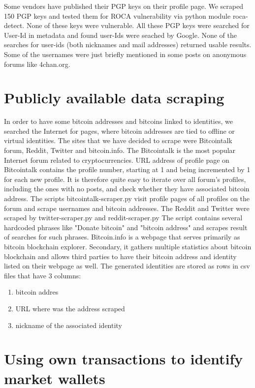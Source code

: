 \documentclass[
  digital, %
  table,   %
  lof,     %
  lot,     %
  oneside
]{fithesis3}
\begin{document}
Some vendors have published their PGP keys on their profile page.
We scraped 150 PGP keys and tested them for ROCA vulnerability via python module roca-detect. None of these keys were vulnerable.
All these PGP keys were searched for User-Id in metadata and found user-Ids were seached by Google.
None of the searches for user-ids (both nicknames and mail addresses) returned usable results.
Some of the usernames were just briefly mentioned in some posts on anonymous forums like 4chan.org.

\section{Publicly available data scraping}
\label{Publicly available data scraping}

In order to have some bitcoin addresses and bitcoins linked to identities,
we searched the Internet for pages, where bitcoin addresses are tied to offline or virtual identities.
The sites that we have decided to scrape were Bitcointalk forum, Reddit, Twitter and bitcoin.info.
The Bitcointalk is the most popular Internet forum
related to cryptocurrencies. URL address of profile page on Bitcointalk
contains the profile number, starting at 1 and being incremented by 1
for each new profile. It is therefore quite easy to iterate over all forum's profiles,
including the ones with no posts, and check whether they have associated bitcoin address.
The scripts bitcointalk-scraper.py visit profile pages of all profiles on the forum and scrape usernames and bitcoin addresses. 
The Reddit and Twitter were scraped by twitter-scraper.py and reddit-scraper.py
The script contains several hardcoded phrases like "Donate bitcoin" and "bitcoin address" and scrapes 
result of searches for such phrases.
Bitcoin.info is a webpage that serves primarily as bitcoin blockchain explorer. Secondary,
it gathers multiple statistics about bitcoin blockchain and allows
third parties to have their bitcoin address and identity listed on their webpage as well.
The generated identities are stored as rows in csv files that have 3 columns:

\begin{enumerate}
 \item bitcoin addres
 \item URL where was the address scraped
 \item nickname of the associated identity
\end{enumerate}

\section{Using own transactions to identify market wallets}
\label{Using own transactions to identify market wallets}
\end{document}
